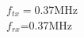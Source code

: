 \documentclass[preview]{standalone}
\begin{document}
\begin{center}
$f_{tx}=$0.37MHz\\$f_{rx}$=0.37MHz
\end{center}
\end{document}
